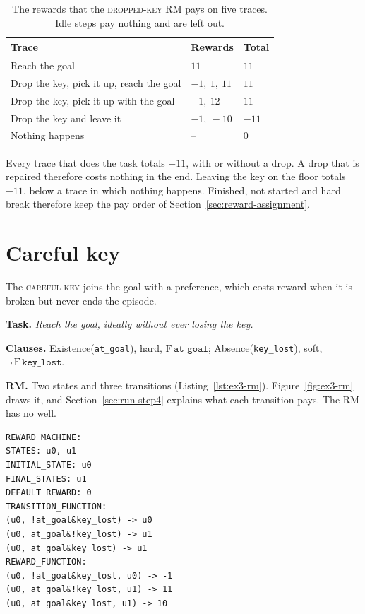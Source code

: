 \documentclass[11pt,english,listoffigures,listoftables]{tfgetsinf}
\newcommand{\runex}[1]{\textsc{#1}}  %
\newcommand{\gain}[1]{\textcolor{green!40!black}{\bfseries\boldmath #1}}  %
\newcommand{\loss}[1]{\textcolor{red!60!black}{\bfseries\boldmath #1}}  %
\begin{document}
\begin{table}[H]
\centering
\footnotesize
\renewcommand{\arraystretch}{1.2}
\begin{tabular}{@{}lll@{}}
\toprule
\textbf{Trace} & \textbf{Rewards} & \textbf{Total} \\ \midrule
Reach the goal & $11$ & $11$ \\
Drop the key, pick it up, reach the goal & $-1,\ 1,\ 11$ & $11$ \\
Drop the key, pick it up with the goal & $-1,\ 12$ & $11$ \\
Drop the key and leave it & $-1,\ -10$ & $-11$ \\
Nothing happens & -- & $0$ \\ \bottomrule
\end{tabular}
\caption[Rewards of the \runex{dropped key} on five traces]{The rewards that the \runex{dropped-key} RM pays on five traces. Idle steps pay nothing and are left out.}
\label{tab:ex2-traces}
\end{table}

Every trace that does the task totals \gain{$+11$}, with or without a drop. A drop that is repaired therefore costs nothing in the end. Leaving the key on the floor totals \loss{$-11$}, below a trace in which nothing happens. Finished, not started and hard break therefore keep the pay order of Section~\ref{sec:reward-assignment}.

\section{Careful key}
\label{app:ex3}
The \runex{careful key} joins the goal with a preference, which costs reward when it is broken but never ends the episode.

\textbf{Task.} \textit{Reach the goal, ideally without ever losing the key.}

\textbf{Clauses.} Existence(\texttt{at\_goal}), hard, $\mathrm{F}\,\texttt{at\_goal}$; Absence(\texttt{key\_lost}), soft, $\neg\,\mathrm{F}\,\texttt{key\_lost}$.

\textbf{RM.} Two states and three transitions (Listing~\ref{lst:ex3-rm}). Figure~\ref{fig:ex3-rm} draws it, and Section~\ref{sec:run-step4} explains what each transition pays. The RM has no well.

\noindent\begin{minipage}{\linewidth}
\begin{lstlisting}[style=rm,caption={The RM of the \runex{careful-key} example.},label={lst:ex3-rm}]
REWARD_MACHINE:
STATES: u0, u1
INITIAL_STATE: u0
FINAL_STATES: u1
DEFAULT_REWARD: 0
TRANSITION_FUNCTION:
(u0, !at_goal&key_lost) -> u0
(u0, at_goal&!key_lost) -> u1
(u0, at_goal&key_lost) -> u1
REWARD_FUNCTION:
(u0, !at_goal&key_lost, u0) -> -1
(u0, at_goal&!key_lost, u1) -> 11
(u0, at_goal&key_lost, u1) -> 10
\end{lstlisting}
\end{minipage}

\end{document}
